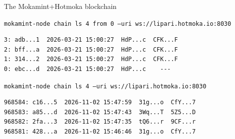 \documentclass[11pt]{beamer}  %
\begin{document}
\medskip

\begin{frame}[fragile]{The Mokamint+Hotmoka blockchain}

  \begin{greenbox}{\texttt{mokamint-node chain ls 4 from 0 --uri ws://lipari.hotmoka.io:8030}}
\begin{verbatim}
3: adb...1  2026-03-21 15:00:27  HdP...c  CFK...F
2: bff...a  2026-03-21 15:00:27  HdP...c  CFK...F
1: 314...2  2026-03-21 15:00:27  HdP...c  CFK...F
0: ebc...d  2026-03-21 15:00:27  HdP...c    ---                     
\end{verbatim}
  \end{greenbox}

  \pause
  \bigskip

  \begin{greenbox}{\texttt{mokamint-node chain ls 4 --uri ws://lipari.hotmoka.io:8030}}
\begin{verbatim}
968584: c16...5  2026-11-02 15:47:59  31g...o  CfY...7
968583: a85...d  2026-11-02 15:47:43  3Wq...T  5Z5...D
968582: 2fa...3  2026-11-02 15:47:35  tQ6...r  9CF...r
968581: 428...a  2026-11-02 15:46:46  31g...o  CfY...7
\end{verbatim}
  \end{greenbox}
\end{frame}
\end{document}
